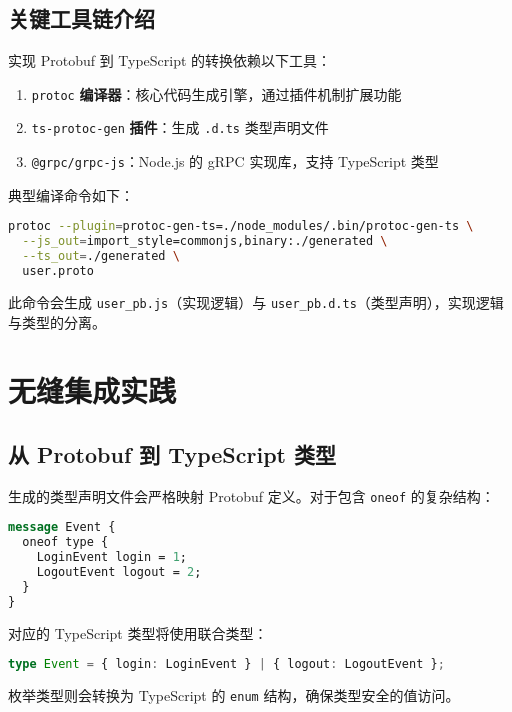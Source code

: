 \section{关键工具链介绍}
实现 Protobuf 到 TypeScript 的转换依赖以下工具：\par
\begin{enumerate}
\item \verb!protoc! \textbf{编译器}：核心代码生成引擎，通过插件机制扩展功能
\item \verb!ts-protoc-gen! \textbf{插件}：生成 \verb!.d.ts! 类型声明文件
\item \verb!@grpc/grpc-js!：Node.js 的 gRPC 实现库，支持 TypeScript 类型
\end{enumerate}
典型编译命令如下：\par
\begin{lstlisting}[language=bash]
protoc --plugin=protoc-gen-ts=./node_modules/.bin/protoc-gen-ts \
  --js_out=import_style=commonjs,binary:./generated \
  --ts_out=./generated \
  user.proto
\end{lstlisting}
此命令会生成 \verb!user_pb.js!（实现逻辑）与 \verb!user_pb.d.ts!（类型声明），实现逻辑与类型的分离。\par
\chapter{无缝集成实践}
\section{从 Protobuf 到 TypeScript 类型}
生成的类型声明文件会严格映射 Protobuf 定义。对于包含 \verb!oneof! 的复杂结构：\par
\begin{lstlisting}[language=protobuf]
message Event {
  oneof type {
    LoginEvent login = 1;
    LogoutEvent logout = 2;
  }
}
\end{lstlisting}
对应的 TypeScript 类型将使用联合类型：\par
\begin{lstlisting}[language=typescript]
type Event = { login: LoginEvent } | { logout: LogoutEvent };
\end{lstlisting}
枚举类型则会转换为 TypeScript 的 \verb!enum! 结构，确保类型安全的值访问。\par

